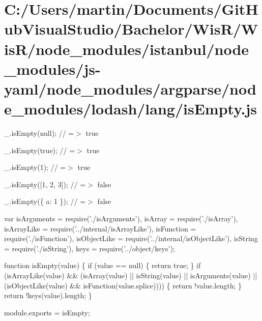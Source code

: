 \hypertarget{_c_1_2_users_2martin_2_documents_2_git_hub_visual_studio_2_bachelor_2_wis_r_2_wis_r_2node_moduleb1eb0222e2e40ab7ee6dcf8533a13248}{}\section{C\+:/\+Users/martin/\+Documents/\+Git\+Hub\+Visual\+Studio/\+Bachelor/\+Wis\+R/\+Wis\+R/node\+\_\+modules/istanbul/node\+\_\+modules/js-\/yaml/node\+\_\+modules/argparse/node\+\_\+modules/lodash/lang/is\+Empty.\+js}
\+\_\+.\+is\+Empty(null); // =$>$ true

\+\_\+.\+is\+Empty(true); // =$>$ true

\+\_\+.\+is\+Empty(1); // =$>$ true

\+\_\+.\+is\+Empty(\mbox{[}1, 2, 3\mbox{]}); // =$>$ false

\+\_\+.\+is\+Empty(\{ \textquotesingle{}a\textquotesingle{}\+: 1 \}); // =$>$ false


\begin{DoxyCodeInclude}
var isArguments = require(\textcolor{stringliteral}{'./isArguments'}),
    isArray = require(\textcolor{stringliteral}{'./isArray'}),
    isArrayLike = require(\textcolor{stringliteral}{'../internal/isArrayLike'}),
    isFunction = require(\textcolor{stringliteral}{'./isFunction'}),
    isObjectLike = require(\textcolor{stringliteral}{'../internal/isObjectLike'}),
    isString = require(\textcolor{stringliteral}{'./isString'}),
    keys = require(\textcolor{stringliteral}{'../object/keys'});

\textcolor{keyword}{function} isEmpty(value) \{
  \textcolor{keywordflow}{if} (value == null) \{
    \textcolor{keywordflow}{return} \textcolor{keyword}{true};
  \}
  \textcolor{keywordflow}{if} (isArrayLike(value) && (isArray(value) || isString(value) || isArguments(value) ||
      (isObjectLike(value) && isFunction(value.splice)))) \{
    \textcolor{keywordflow}{return} !value.length;
  \}
  \textcolor{keywordflow}{return} !keys(value).length;
\}

module.exports = isEmpty;
\end{DoxyCodeInclude}
 